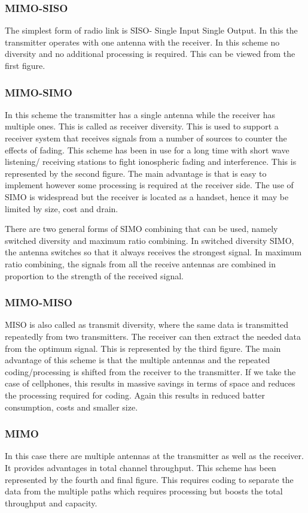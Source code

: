 \subsubsection{MIMO-SISO}
The simplest form of radio link is SISO- Single Input Single Output. In this the transmitter operates with one antenna with the receiver. In this scheme no diversity and no additional processing is required. This can be viewed from the first figure.

\subsubsection{MIMO-SIMO}
In this scheme the transmitter has a single antenna while the receiver has multiple ones. This is called as receiver diversity. This is used to support a receiver system that receives signals from a number of sources to counter the effects of fading. This scheme has been in use for a long time with short wave listening/ receiving stations to fight ionospheric fading and interference. This is represented by the second figure. The main advantage is that is easy to implement however some processing is required at the receiver side. The use of SIMO is widespread but the receiver is located as a handset, hence it may be limited by size, cost and drain.

There are two general forms of SIMO combining that can be used, namely switched diversity and maximum ratio combining. In switched diversity SIMO, the antenna switches so that it always receives the strongest signal. In maximum ratio combining, the signals from all the receive antennas are combined in proportion to the strength of the received signal.

\subsubsection{MIMO-MISO}
MISO is also called as transmit diversity, where the same data is transmitted repeatedly from two transmitters. The receiver can then extract the needed data from the optimum signal. This is represented by the third figure. The main advantage of this scheme is that the multiple antennas and the repeated coding/processing is shifted from the receiver to the transmitter. If we take the case of cellphones, this results in massive savings in terms of space and reduces the processing required for coding. Again this results in reduced batter consumption, costs and smaller size.

\subsubsection{MIMO}
In this case there are multiple antennas at the transmitter as well as the receiver. It provides advantages in total channel throughput. This scheme has been represented by the fourth and final figure. This requires coding to separate the data from the multiple paths which requires processing but boosts the total throughput and capacity.

